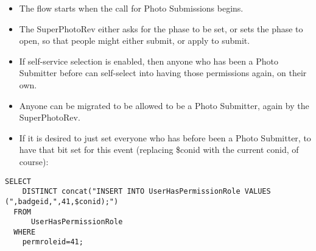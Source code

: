 \documentclass[captions=tablesignature]{scrartcl}
\begin{document}
\begin{itemize}
\item The flow starts when the call for Photo Submissions begins.
\item The SuperPhotoRev either asks for the phase to be set, or sets the
phase to open, so that people might either submit, or apply to
submit.
\item If self-service selection is enabled, then anyone who has been a
Photo Submitter before can self-select into having those
permissions again, on their own.
\item Anyone can be migrated to be allowed to be a Photo Submitter,
again by the SuperPhotoRev.
\item If it is desired to just set everyone who has before been a Photo
Submitter, to have that bit set for this event (replacing \$conid
with the current conid, of course):
\end{itemize}
\begin{verbatim}
SELECT
    DISTINCT concat("INSERT INTO UserHasPermissionRole VALUES (",badgeid,",41,$conid);")
  FROM
      UserHasPermissionRole
  WHERE
    permroleid=41;
\end{verbatim}
\end{document}

